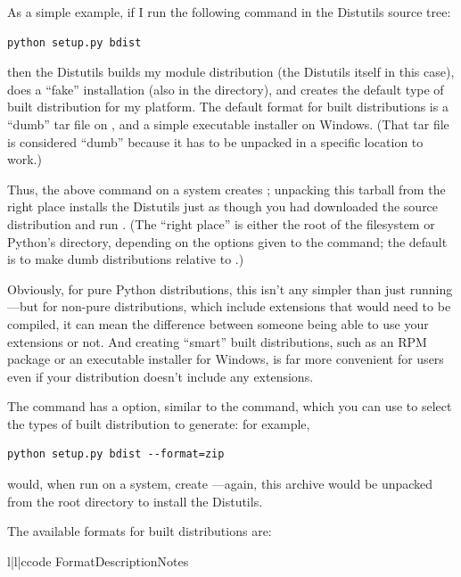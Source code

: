 \documentclass{howto}
\begin{document}
As a simple example, if I run the following command in the Distutils
source tree:

\begin{verbatim}
python setup.py bdist
\end{verbatim}

then the Distutils builds my module distribution (the Distutils itself
in this case), does a ``fake'' installation (also in the 
directory), and creates the default type of built distribution for my
platform.  The default format for built distributions is a ``dumb'' tar
file on \UNIX, and a simple executable installer on Windows.  (That tar
file is considered ``dumb'' because it has to be unpacked in a specific
location to work.)

Thus, the above command on a \UNIX{} system creates
; unpacking this tarball
from the right place installs the Distutils just as though you had
downloaded the source distribution and run .  (The ``right place'' is either the root of the filesystem or 
Python's  directory, depending on the options given to
the  command; the default is to make dumb
distributions relative to .)  

Obviously, for pure Python distributions, this isn't any simpler than
just running ---but for non-pure
distributions, which include extensions that would need to be
compiled, it can mean the difference between someone being able to use
your extensions or not.  And creating ``smart'' built distributions,
such as an RPM package or an executable installer for Windows, is far
more convenient for users even if your distribution doesn't include
any extensions.

The  command has a  option,
similar to the  command, which you can use to select the
types of built distribution to generate: for example,

\begin{verbatim}
python setup.py bdist --format=zip
\end{verbatim}

would, when run on a \UNIX{} system, create
---again, this archive would be
unpacked from the root directory to install the Distutils.

The available formats for built distributions are:
\begin{tableiii}{l|l|c}{code}%
  {Format}{Description}{Notes}
\end{tableiii}
\end{document}
